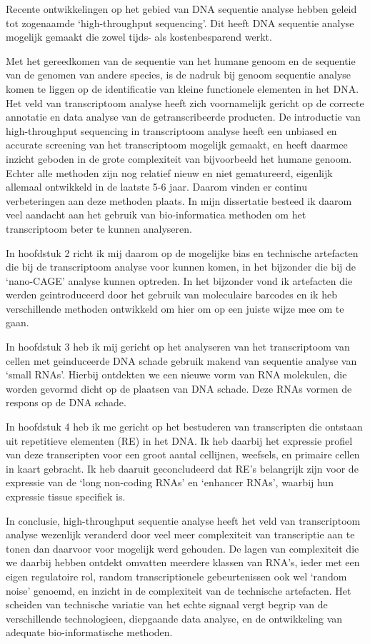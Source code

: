 Recente ontwikkelingen op het gebied van DNA sequentie analyse hebben geleid tot zogenaamde ‘high-throughput sequencing’. Dit heeft DNA sequentie analyse mogelijk gemaakt die zowel tijds- als kostenbesparend werkt.

Met het gereedkomen van de sequentie van het humane genoom en de sequentie van de genomen van andere species, is de nadruk bij genoom sequentie analyse komen te liggen op de identificatie van kleine functionele elementen in het DNA.  Het veld van transcriptoom analyse heeft zich voornamelijk gericht op de correcte annotatie en data analyse van de getranscribeerde producten. De introductie van high-throughput sequencing in transcriptoom analyse heeft een unbiased en accurate screening van het transcriptoom mogelijk gemaakt, en heeft daarmee inzicht geboden in de grote complexiteit van bijvoorbeeld het humane genoom. Echter alle methoden zijn nog relatief nieuw en niet gematureerd, eigenlijk allemaal ontwikkeld in de laatste 5-6 jaar. Daarom vinden er continu verbeteringen aan deze methoden plaats. In mijn dissertatie besteed ik daarom veel aandacht aan het gebruik van bio-informatica methoden om het transcriptoom beter te kunnen analyseren.

In hoofdstuk 2 richt ik mij daarom op de mogelijke bias en technische artefacten  die bij de transcriptoom analyse voor kunnen komen, in het bijzonder die bij de ‘nano-CAGE’ analyse kunnen optreden. In het bijzonder vond ik artefacten die werden geintroduceerd door het gebruik van moleculaire barcodes en ik heb verschillende methoden ontwikkeld om hier om op een juiste wijze mee om te gaan.

In hoofdstuk 3 heb ik mij gericht op het analyseren van het transcriptoom van cellen met geinduceerde DNA schade gebruik makend van sequentie analyse van ‘small RNAs’. Hierbij ontdekten we een nieuwe vorm van RNA molekulen, die worden gevormd dicht op de plaatsen van DNA schade. Deze RNAs vormen de respons op de DNA schade.

In hoofdstuk 4 heb ik me gericht op het bestuderen van transcripten die ontstaan uit repetitieve elementen (RE) in het DNA. Ik heb daarbij het expressie profiel van deze transcripten voor een groot aantal cellijnen, weefsels, en primaire cellen in kaart gebracht. Ik heb daaruit geconcludeerd dat RE’s belangrijk zijn voor de expressie van de ‘long non-coding RNAs’ en ‘enhancer RNAs’, waarbij hun expressie tissue specifiek is.

In conclusie, high-throughput sequentie analyse heeft het veld van transcriptoom analyse wezenlijk veranderd door veel meer complexiteit van transcriptie aan te tonen dan daarvoor voor mogelijk werd gehouden. De lagen van complexiteit die we daarbij hebben ontdekt omvatten meerdere klassen van RNA’s, ieder met een eigen regulatoire rol, random transcriptionele gebeurtenissen ook wel ‘random noise’ genoemd, en inzicht in de complexiteit van de technische artefacten. Het scheiden van technische variatie van het echte signaal vergt begrip van de verschillende technologieen, diepgaande data analyse, en de ontwikkeling van adequate bio-informatische methoden.
